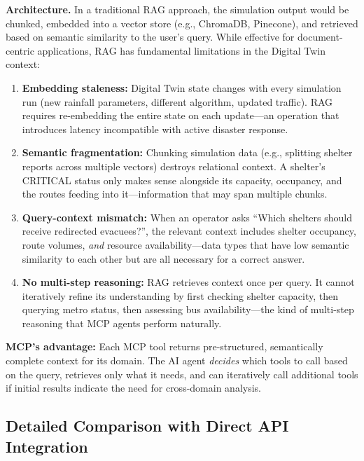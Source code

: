 \documentclass[journal]{IEEEtran}
\begin{document}
\textbf{Architecture.} In a traditional RAG approach, the simulation output
would be chunked, embedded into a vector store (e.g., ChromaDB, Pinecone),
and retrieved based on semantic similarity to the user's query. While
effective for document-centric applications, RAG has fundamental limitations
in the Digital Twin context:

\begin{enumerate}[leftmargin=*]
    \item \textbf{Embedding staleness:} Digital Twin state changes with
    every simulation run (new rainfall parameters, different algorithm, updated
    traffic). RAG requires re-embedding the entire state on each update---an
    operation that introduces latency incompatible with active disaster
    response.

    \item \textbf{Semantic fragmentation:} Chunking simulation data (e.g.,
    splitting shelter reports across multiple vectors) destroys relational
    context. A shelter's CRITICAL status only makes sense alongside its
    capacity, occupancy, and the routes feeding into it---information that
    may span multiple chunks.

    \item \textbf{Query-context mismatch:} When an operator asks ``Which
    shelters should receive redirected evacuees?'', the relevant context
    includes shelter occupancy, route volumes, \emph{and} resource
    availability---data types that have low semantic similarity to each
    other but are all necessary for a correct answer.

    \item \textbf{No multi-step reasoning:} RAG retrieves context once per
    query. It cannot iteratively refine its understanding by first checking
    shelter capacity, then querying metro status, then assessing bus
    availability---the kind of multi-step reasoning that MCP agents perform
    naturally.
\end{enumerate}

\textbf{MCP's advantage:} Each MCP tool returns pre-structured, semantically
complete context for its domain. The AI agent \emph{decides} which tools to
call based on the query, retrieves only what it needs, and can iteratively
call additional tools if initial results indicate the need for cross-domain
analysis.

\subsection{Detailed Comparison with Direct API Integration}
\end{document}
